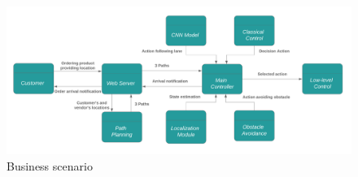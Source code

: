 
  \begin{figure}[H]%
    \center%
    \includegraphics[width=\textwidth]
    {images/Alzahraa/business_scenario.png}%
    \caption[Business Scenario]{Business scenario}\label{fig:business scenario}%
  \end{figure}

